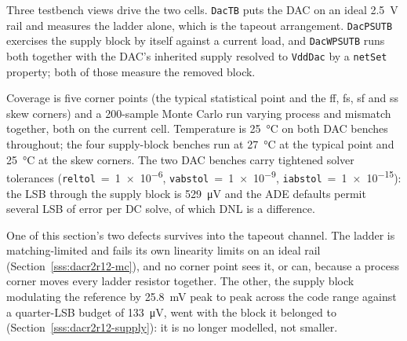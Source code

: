 Three testbench views drive the two cells. \texttt{DacTB} puts the DAC on an ideal
\SI{2.5}{\volt} rail and measures the ladder alone, which is the tapeout arrangement.
\texttt{DacPSUTB} exercises the supply block by itself against a current load, and
\texttt{DacWPSUTB} runs both together with the DAC's inherited supply resolved to
\texttt{VddDac} by a \texttt{netSet} property; both of those measure the removed
block.

Coverage is five corner points (the typical statistical point and the ff, fs, sf and
ss skew corners) and a 200-sample Monte Carlo run varying process and mismatch
together, both on the current cell. Temperature is \SI{25}{\celsius} on both DAC benches throughout; the four
supply-block benches run at \SI{27}{\celsius} at the typical point and \SI{25}{\celsius}
at the skew corners. The two DAC benches carry tightened solver tolerances
(\texttt{reltol}~=~\num{1e-6}, \texttt{vabstol}~=~\num{1e-9},
\texttt{iabstol}~=~\num{1e-15}): the LSB through the supply block is \SI{529}{\micro\volt}
and the ADE defaults permit several LSB of error per DC solve, of which DNL is a
difference.

One of this section's two defects survives into the tapeout channel. The ladder is
matching-limited and fails its own linearity limits on an ideal rail
(Section~\ref{sss:dacr2r12-mc}), and no corner point sees it, or can, because a process
corner moves every ladder resistor together. The other, the supply block modulating the
reference by \SI{25.8}{\milli\volt} peak to peak across the code range against a
quarter-LSB budget of \SI{133}{\micro\volt}, went with the block it belonged to
(Section~\ref{sss:dacr2r12-supply}): it is no longer modelled, not smaller.
